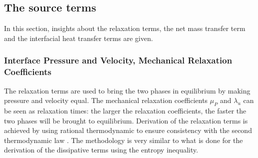 \subsection{The source terms}\label{sec:source-terms-7-eqt-sect5}
In this section, insights about the relaxation terms, the net mass transfer term and the interfacial heat transfer terms are given.
\subsubsection{Interface Pressure and Velocity, Mechanical Relaxation Coefficients}
The relaxation terms are used to bring the two phases in equilibrium by making pressure and velocity equal. The mechanical relaxation coefficients $\mu_P$ and $\lambda_u$ can be seen as relaxation times: the larger the relaxation coefficients, the faster the two phases will be brought to equilibrium. Derivation of the relaxation terms is achieved by using rational thermodynamic to ensure consistency with the second thermodynamic law \cite{Truesdell}. The methodology is very similar to what is done for the derivation of the dissipative terms using the entropy inequality.

